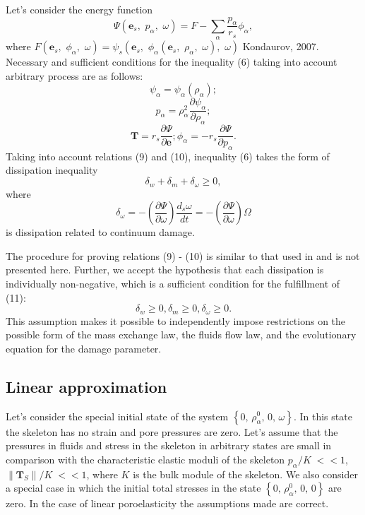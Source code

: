 \documentclass[article,authoryear,jpm]{beg_39}             %
\begin{document}
Let’s consider the energy function $$\Psi \left( {{\mathbf{e}}_{s}},\,\,{{p}_{\alpha }},\,\,\omega \right)=F-\sum\limits_{\alpha }{\frac{{{p}_{\alpha }}}{{{r}_{s}}}{{\phi }_{\alpha }}},$$ where $F\left( {{\mathbf{e}}_{s}},\,\,{{\phi }_{\alpha }},\,\,\omega \right)={{\psi }_{s}}\left( {{\mathbf{e}}_{s}},\,\,{{\phi }_{\alpha }}\left( {{\mathbf{e}}_{s}},\,\,{{\rho }_{\alpha }},\,\,\omega \right),\,\,\omega \right)$ Kondaurov, 2007. Necessary and sufficient conditions for the inequality (6) taking into account arbitrary process are as follows:
\begin{equation}
{{\psi }_{\alpha }}={{\psi }_{\alpha }}\left( {{\rho }_{\alpha }} \right); 
\end{equation}
\begin{equation}
{{p}_{\alpha }}=\rho _{\alpha }^{2}\frac{\partial {{\psi }_{\alpha }}}{\partial {{\rho }_{\alpha }}};
\end{equation}
\begin{equation}
\mathbf{T}={{r}_{s}}\frac{\partial \Psi }{\partial \mathbf{e}}; {{\phi }_{\alpha }}=-{{r}_{s}}\frac{\partial \Psi }{\partial {{p}_{\alpha }}}.
\end{equation}
Taking into account relations (9) and (10), inequality (6) takes the form of dissipation inequality
\begin{equation}
{{\delta }_{w}}+{{\delta }_{m}}+{{\delta }_{\omega }}\ge 0,
\end{equation}
where $${{\delta }_{\omega }}=-\left( \frac{\partial \Psi }{\partial \omega } \right)\frac{{{d}_{s}}\omega }{dt}=-\left( \frac{\partial \Psi }{\partial \omega } \right)\Omega$$ is dissipation related to continuum damage.

The procedure for proving relations (9) - (10) is similar to that used in \cite{Truesdell, Kondaurov2007} and is not presented here.
Further, we accept the hypothesis that each dissipation is individually non-negative, which is a sufficient condition for the fulfillment of (11):
\begin{equation}
{{\delta }_{w}}\ge 0, {{\delta }_{m}}\ge 0, {{\delta }_{\omega }}\ge 0.
\end{equation}
This assumption makes it possible to independently impose restrictions on the possible form of the mass exchange law, the fluids flow law, and the evolutionary equation for the damage parameter.
\subsection{Linear approximation}
Let’s consider the special initial state of the system
$\left\{ 0,\,\rho _{\alpha }^{0},\,0,\,\omega \right\}$.
In this state the skeleton has no strain and pore pressures are zero.
Let’s assume that the pressures in fluids and stress in the skeleton in arbitrary states are small in comparison with the characteristic elastic moduli of the skeleton
${{{p}_{\alpha }}}/{K}\;<<1$, ${\left\| {{\mathbf{T}}_{S}} \right\|}/{K}\;<<1$,
where $K$ is the bulk module of the skeleton. We also consider a special case in which the initial total stresses in the state
$\left\{ 0,\,\rho _{\alpha }^{0},\,0,\,0 \right\}$
are zero. In the case of linear poroelasticity the assumptions made are correct.
\end{document}
